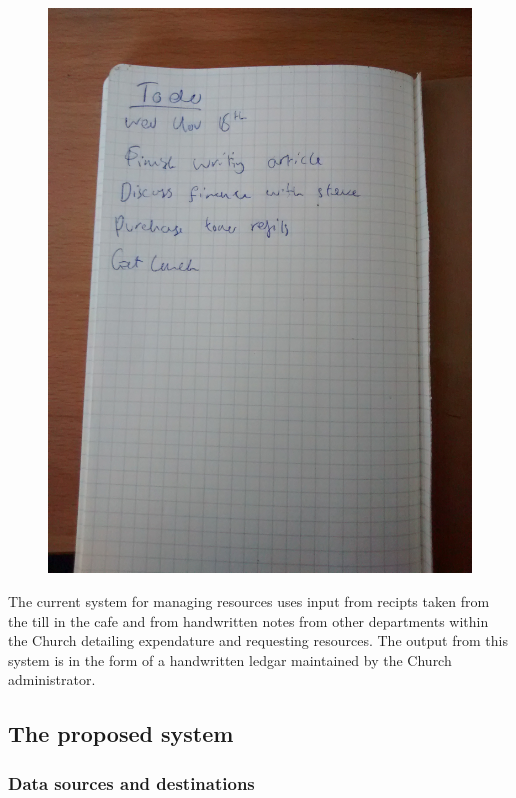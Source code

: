 \begin{figure}[H]
	\includegraphics[width=\textwidth]{./Analysis/diagrams/todo.jpg}
\end{figure}

The current system for managing resources uses input from recipts taken from the till in the cafe and from handwritten notes from
other departments within the Church detailing expendature and requesting resources. The output from this system is in the form of a handwritten ledgar maintained by the Church administrator.

\subsection{The proposed system}

\subsubsection{Data sources and destinations}

